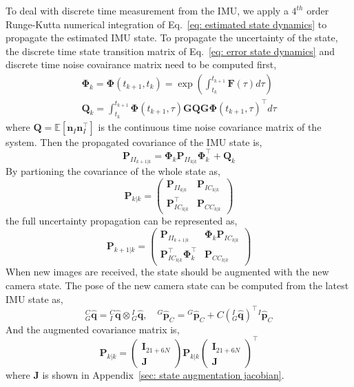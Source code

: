To deal with discrete time measurement from the IMU, we apply a $4^{th}$ order Runge-Kutta numerical integration of Eq.~\eqref{eq: estimated state dynamics} to propagate the estimated IMU state. To propagate the uncertainty of the state, the discrete time state transition matrix of Eq.~\eqref{eq: error state dynamics} and discrete time noise covairance matrix need to be computed first, 
\begin{equation*}
\begin{gathered}
\bm{\Phi}_k = \bm{\Phi}(t_{k+1}, t_k) = 
\exp\left(\int_{t_k}^{t_{k+1}} \mathbf{F}(\tau)d\tau\right) \\
\mathbf{Q}_k = \int_{t_k}^{t_{k+1}} \bm{\Phi}(t_{k+1},\tau)\mathbf{G}\mathbf{Q}\mathbf{G}\bm{\Phi}(t_{k+1},\tau)^\top d\tau
\end{gathered}
\end{equation*}
where $\mathbf{Q} = \mathbb{E}\left[\mathbf{n}_I^{}\mathbf{n}_I^\top\right]$ is the continuous time noise covariance matrix of the system. Then the propagated covariance of the IMU state is,
\begin{equation*}
\mathbf{P}_{II_{k+1|k}} = \bm{\Phi}_k\mathbf{P}_{II_{k|k}}\bm{\Phi}_k^\top + \mathbf{Q}_k
\end{equation*}
By partioning the covariance of the whole state as,
\begin{equation*}
\mathbf{P}_{k|k} = 
\begin{pmatrix}
\mathbf{P}_{II_{k|k}} & \mathbf{P}_{IC_{k|k}} \\
\mathbf{P}_{IC_{k|k}}^\top & \mathbf{P}_{CC_{k|k}}
\end{pmatrix}
\end{equation*}
the full uncertainty propagation can be represented as,
\begin{equation*}
\mathbf{P}_{k+1|k} = 
\begin{pmatrix}
\mathbf{P}_{II_{k+1|k}} & \bm{\Phi}_k \mathbf{P}_{IC_{k|k}} \\
\mathbf{P}_{IC_{k|k}}^\top \bm{\Phi}_k^\top & \mathbf{P}_{CC_{k|k}}
\end{pmatrix}
\end{equation*}
When new images are received, the state should be augmented with the new camera state. The pose of the new camera state can be computed from the latest IMU state as,
\begin{equation*}
{}^C_G\hat{\mathbf{q}} = {}^C_I\hat{\mathbf{q}} \otimes {}^I_G\hat{\mathbf{q}}, \quad
{}^G\hat{\mathbf{p}}_C = {}^G\hat{\mathbf{p}}_C + C\left({}^I_G\hat{\mathbf{q}}\right)^\top {}^I\hat{\mathbf{p}}_C
\end{equation*}
And the augmented covariance matrix is,
\begin{equation}
\label{eq: state covariance augmentation}
\mathbf{P}_{k|k} = 
\begin{pmatrix}
\mathbf{I}_{21+6N} \\ \mathbf{J}
\end{pmatrix}
\mathbf{P}_{k|k}
\begin{pmatrix}
\mathbf{I}_{21+6N} \\ \mathbf{J}
\end{pmatrix}^\top
\end{equation}
where $\mathbf{J}$ is shown in Appendix~\ref{sec: state augmentation jacobian}.